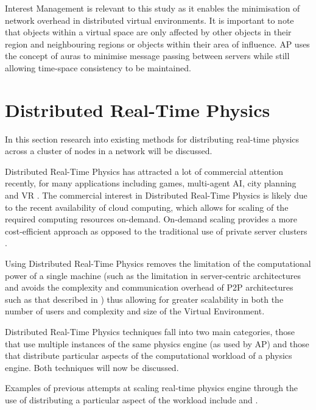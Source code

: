 Interest Management is relevant to this study as it enables the minimisation of network overhead in distributed virtual environments. It is important to note that objects within a virtual space are only affected by other objects in their region and neighbouring regions or objects within their area of influence. AP uses the concept of auras to minimise message passing between servers while still allowing time-space consistency to be maintained.

\section{Distributed Real-Time Physics}

In this section research into existing methods for distributing real-time physics across a cluster of nodes in a network will be discussed.

Distributed Real-Time Physics has attracted a lot of commercial attention recently, for many applications including games, multi-agent AI, city planning and VR \cite{SpatialOS}. The commercial interest in Distributed Real-Time Physics is likely due to the recent availability of cloud computing, which allows for scaling of the required computing resources on-demand. On-demand scaling provides a more cost-efficient approach as opposed to the traditional use of private server clusters \cite{On-DemandResourceMMOGs}.

Using Distributed Real-Time Physics removes the limitation of the computational power of a single machine (such as the limitation in server-centric architectures \cite{ScalabilityforVirtualWorlds} and avoids the complexity and communication overhead of P2P architectures such as that described in \cite{VON}) thus allowing for greater scalability in both the number of users \cite{ScalabilityIssues} and complexity and size of the Virtual Environment. 

Distributed Real-Time Physics techniques fall into two main categories, those that use multiple instances of the same physics engine (as used by AP) and those that distribute particular aspects of the computational workload of a physics engine. Both techniques will now be discussed.

Examples of previous attempts at scaling real-time physics engine through the use of distributing a particular aspect of the workload include \cite{Morgan2005} and \cite{allard2006distributed}.


